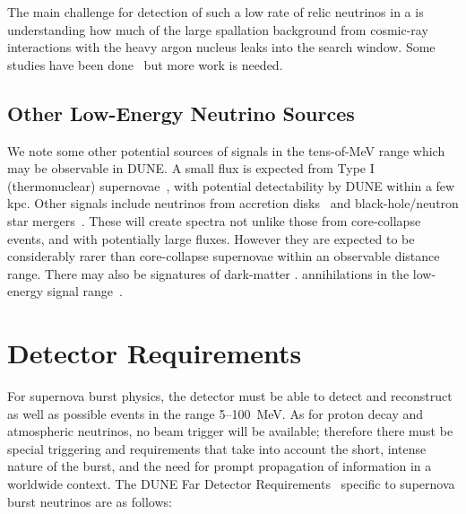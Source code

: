  The main challenge for detection of such
a low rate of relic neutrinos in a  is understanding how much of
the large spallation background from cosmic-ray interactions with the
heavy argon nucleus 
leaks into the search window.   Some studies have been done~\cite{Barker:2012nb} but more work is needed.

\subsection{Other Low-Energy Neutrino Sources}

We note some other potential sources of signals in the tens-of-MeV
range which may be observable in DUNE.  A small flux is expected from
Type I (thermonuclear) supernovae~\cite{Wright:2016gar,
  Wright:2016xma}, with potential detectability by DUNE within a few
kpc.   Other signals include neutrinos from accretion disks~\cite{Caballero:2011dw} and black-hole/neutron star mergers~\cite{Caballero:2009ww}.  These will create spectra not unlike those from core-collapse events, and with potentially large fluxes.  However they are expected to be considerably rarer than core-collapse supernovae within an observable distance range.  There may also be signatures of dark-matter . annihilations in the low-energy signal range~\cite{Rott:2012qb, Bernal:2012qh}.



\section{Detector Requirements}
\label{sec:physics-snblowe-detector-requirements}

For supernova burst physics, the detector must be able to detect and reconstruct as well as possible events in the range 5--100~MeV.  As for proton decay and atmospheric neutrinos, no beam trigger will be available; therefore there must be special triggering and  requirements that take into account the short, intense nature of the burst, and the need for prompt propagation of information in a worldwide context.
The DUNE Far Detector
Requirements~\cite{lbnfdune-cdr-req} specific to supernova burst neutrinos are as follows:

